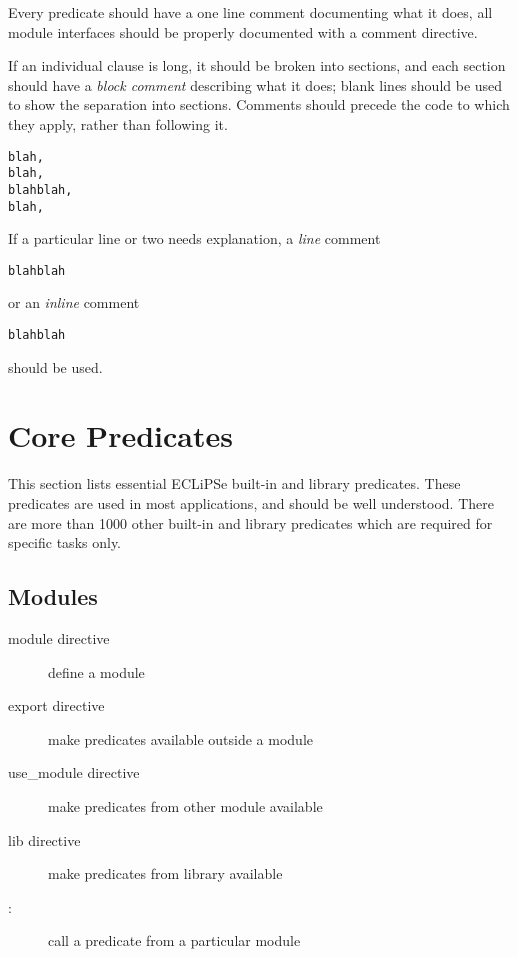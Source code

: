 \documentclass[a4paper,12pt]{report}
\begin{document}
Every predicate should have a one line comment documenting what it does, 
all module interfaces should be properly documented with a comment directive.

If an individual clause is long, it should be broken into sections, and
each section should have a {\it block comment} describing what it does; blank
lines should be used to show the separation into sections.  Comments should
precede the code to which they apply, rather than following it.

\begin{alltt}
%
% This is a block comment; it applies to the code in the next
% section (up to the next blank line).
%
        blah,
        blah,
        blahblah,
        blah,
\end{alltt}

If a particular line or two needs explanation, a {\it line} comment 

\begin{alltt}
        % This is a "line" comment; 
        % it applies to the next line or two
        % of code
        blahblah
\end{alltt}

or an {\it inline} comment 

\begin{alltt}
        blahblah        % This is an "inline" comment
\end{alltt}

should be used.

\chapter{Core Predicates}
\label{corepredicates}

This section lists essential ECLiPSe built-in and library predicates. These predicates are used in most applications, and should be well understood. There are more than 1000 other built-in and library predicates which are required for specific tasks only. 
\section{Modules}
\begin{description}
\item[module directive] define a module
\item[export directive] make predicates available outside a module
\item[use\_module directive] make predicates from other module available
\item[lib directive] make predicates from library available
\item[:] call a predicate from a particular module
\end{description}
\end{document}
